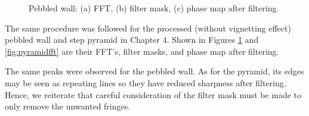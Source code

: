 \captionsetup[figure]{width=6.2in}
\begin{figure}[h!]
	\centering
	\caption[FFT of pebbled wall]{Pebbled wall: (a) FFT, (b) filter mask, (c) phase map after filtering.}
	\label{fig:stonefft}
\end{figure}

The same procedure was followed for the processed (without vignetting effect) pebbled wall and step pyramid in Chapter 4. Shown in Figures \ref{fig:stonefft} and \ref{fig:pyramidfft} are their FFT's, filter masks, and phase map after filtering. 

The same peaks were observed for the pebbled wall. As for the pyramid, its edges may be seen as repeating lines so they have reduced sharpness after filtering. Hence, we reiterate that careful consideration of the filter mask must be made to only remove the unwanted fringes.

